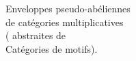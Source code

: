 \begin{flushright}\begin{minipage}{0.46\linewidth}\raggedright
Enveloppes pseudo-abéliennes\\
de catégories multiplicatives\\
( abstraites de\\
Catégories de motifs).
\end{minipage}\end{flushright}
